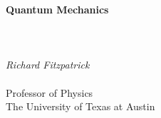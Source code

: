 \documentclass[12pt]{rfbook}
\begin{document}
\pagestyle{fancy}
\renewcommand{\chaptermark}[1]{
\markboth{#1}{}}
\fancyhf{}
\fancyhead[LO,RE]{\sl \leftmark}
\fancyhead[LE,RO]{\sl \thepage}

\thispagestyle{empty}
\begin{center}
{\Huge\bf Quantum Mechanics}\\[1ex]
~\\
~\\
~\\
{\Large\em  Richard Fitzpatrick}\\[1.5ex]~\\[1.5ex]
{\Large\sf  Professor  of Physics}\\[1.5ex]
{\Large\sf  The University of Texas at Austin}\\[10ex]
\end{center}

\tableofcontents
















\end{document}
